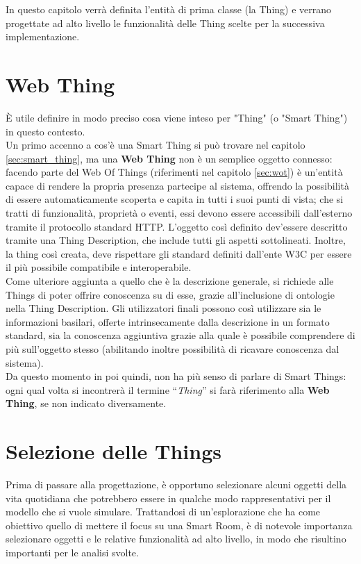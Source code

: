 \documentclass[12pt,a4paper,openright,oneside]{report}
\newcommand{\quotes}[1]{``#1''}
\begin{document}
In questo capitolo verrà definita l'entità di prima classe (la Thing) e verrano progettate ad alto livello le funzionalità delle Thing scelte per la successiva implementazione.


\section{Web Thing}
\label{sec:webthing}
È utile definire in modo preciso cosa viene inteso per "Thing" (o "Smart Thing") in questo contesto.\\

Un primo accenno a cos'è una Smart Thing si può trovare nel capitolo \ref{sec:smart_thing}, ma una \textbf{Web Thing} non è un semplice oggetto connesso: facendo parte del Web Of Things (riferimenti nel capitolo \ref{sec:wot}) è un'entità capace di rendere la propria presenza partecipe al sistema, offrendo la possibilità di essere automaticamente scoperta e capita in tutti i suoi punti di vista; che si tratti di funzionalità, proprietà o eventi, essi devono essere accessibili dall'esterno tramite il protocollo standard HTTP. L'oggetto così definito \mbox{dev'essere} descritto tramite una Thing Description, che include tutti gli aspetti sottolineati. Inoltre, la thing così creata, deve rispettare gli standard definiti dall'ente W3C per essere il più possibile compatibile e interoperabile.\\

Come ulteriore aggiunta a quello che è la descrizione generale, si richiede alle Things di poter offrire conoscenza su di esse, grazie all'inclusione di ontologie nella Thing Description. Gli utilizzatori finali possono così utilizzare sia le informazioni basilari, offerte intrinsecamente dalla descrizione in un formato standard, sia la conoscenza aggiuntiva grazie alla quale è possibile comprendere di più sull'oggetto stesso (abilitando inoltre possibilità di ricavare conoscenza dal sistema).\\

Da questo momento in poi quindi, non ha più senso di parlare di Smart Things: ogni qual volta si incontrerà il termine \quotes{\textit{Thing}} si farà riferimento alla \textbf{Web Thing}, se non indicato diversamente.


\section{Selezione delle Things}
\label{sec:modellazione-things}
Prima di passare alla progettazione, è opportuno selezionare alcuni oggetti della vita quotidiana che potrebbero essere in qualche modo rappresentativi per il modello che si vuole simulare. Trattandosi di un'esplorazione che ha come obiettivo quello di mettere il focus su una Smart Room, è di notevole importanza selezionare oggetti e le relative funzionalità ad alto livello, in modo che risultino importanti per le analisi svolte.\\
\end{document}
